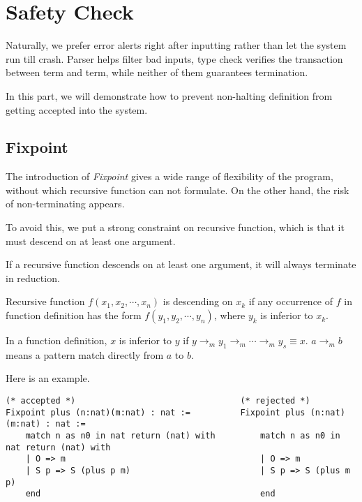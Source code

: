 \section{Safety Check}

Naturally, we prefer error alerts right after inputting rather than let the system run till crash. 
Parser helps filter bad inputs, type check verifies the transaction between term and term, while 
neither of them guarantees termination.\par
In this part, we will demonstrate how to prevent non-halting definition from getting accepted into
the system.

\subsection{Fixpoint}

The introduction of {\it Fixpoint} gives a wide range of flexibility of the program, without which recursive
function can not formulate. On the other hand, the risk of non-terminating appears.\par
To avoid this, we put a strong constraint on recursive function, which is that it must descend on at least one
argument. 
\begin{Prop}
If a recursive function descends on at least one argument, it will always terminate in reduction.
\end{Prop}
\begin{Def}[Descending]
Recursive function $f(x_1,x_2,\cdots,x_n)$ is descending on $x_k$ if any occurrence of $f$ in function definition has the 
form $f(y_1,y_2,\cdots,y_n)$, where $y_k$ is inferior to $x_k$.
\end{Def}
\begin{Def}[Inferior]
In a function definition, $x$ is inferior to $y$ if $y\to_m y_1\to_m \cdots\to_m y_s\equiv x$.
$a \to_m b$ means a pattern match directly from $a$ to $b$.
\end{Def}
Here is an example.
\begin{center}
\begin{verbatim}
(* accepted *)                                 (* rejected *)
Fixpoint plus (n:nat)(m:nat) : nat :=          Fixpoint plus (n:nat)(m:nat) : nat :=
    match n as n0 in nat return (nat) with         match n as n0 in nat return (nat) with    
    | O => m                                       | O => m
    | S p => S (plus p m)                          | S p => S (plus m p)
    end                                            end
\end{verbatim}
\end{center}

